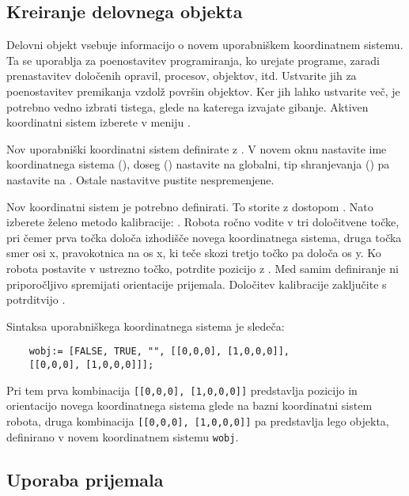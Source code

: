 \subsection{Kreiranje delovnega objekta}

Delovni objekt vsebuje informacijo o novem uporabniškem koordinatnem sistemu. Ta se uporablja za poenostavitev programiranja, ko urejate programe, zaradi prenastavitev določenih opravil, procesov, objektov, itd. Ustvarite jih za poenostavitev premikanja vzdolž površin objektov. Ker jih lahko ustvarite več, je potrebno vedno izbrati tistega, glede na katerega izvajate gibanje. Aktiven koordinatni sistem izberete v meniju .

Nov uporabniški koordinatni sistem definirate z . V novem oknu nastavite ime koordinatnega sistema (), doseg () nastavite na globalni, tip shranjevanja () pa nastavite na . Ostale nastavitve pustite nespremenjene.

Nov koordinatni sistem je potrebno definirati. To storite z dostopom . Nato izberete želeno metodo kalibracije: . Robota ročno vodite v tri določitvene točke, pri čemer prva točka določa izhodišče novega koordinatnega sistema, druga točka smer osi x, pravokotnica na os x, ki teče skozi tretjo točko pa določa os y. Ko robota postavite v ustrezno točko, potrdite pozicijo z . Med samim definiranje ni priporočljivo spremijati orientacije prijemala. Določitev kalibracije zaključite s potrditvijo .


Sintaksa uporabniškega koordinatnega sistema je sledeča:

\begin{verbatim}
	wobj:= [FALSE, TRUE, "", [[0,0,0], [1,0,0,0]],
	[[0,0,0], [1,0,0,0]]];
\end{verbatim}

Pri tem prva kombinacija \verb"[[0,0,0], [1,0,0,0]]" predstavlja pozicijo in orientacijo novega koordinatnega sistema glede na bazni koordinatni sistem robota, druga kombinacija \verb"[[0,0,0], [1,0,0,0]]" pa predstavlja lego objekta, definirano v novem koordinatnem sistemu \verb"wobj".

\subsection{Uporaba prijemala}

